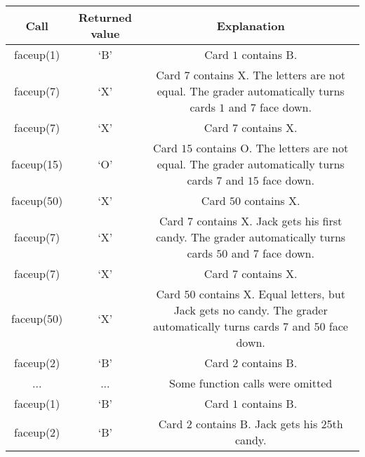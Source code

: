 \begin{center}
\renewcommand{\arraystretch}{1.5}
\begin{tabular}{|c|c|c|}
\hline
Call & Returned value & Explanation \\ 
\hline
faceup(1) & `B' & Card $1$ contains B. \\ 
\hline 
faceup(7) & `X' & \parbox{13cm}{\centering \vspace{2mm}Card $7$ contains X. The letters are not equal. The grader automatically turns cards $1$ and $7$ face down.\\\vspace{2mm}} \\ \hline
faceup(7) & `X' & Card $7$ contains X.\\ 
\hline
faceup(15) & `O' &\parbox{13cm}{\centering \vspace{2mm} Card $15$ contains O. The letters are not equal. The grader automatically turns cards $7$ and $15$ face down.\\\vspace{2mm}} \\ 
\hline
faceup(50) & `X' & Card $50$ contains X.\\ 
\hline
faceup(7) & `X' & \parbox{13cm}{\centering \vspace{2mm}Card $7$ contains X. Jack gets his first candy. The grader automatically turns cards $50$ and $7$ face down.\\\vspace{2mm}}\\ \hline
faceup(7) & `X' & Card $7$ contains X. \\ 
\hline
faceup(50) & `X' & \parbox{13cm}{\centering \vspace{2mm}Card $50$ contains X. Equal letters, but Jack gets no candy. The grader automatically turns cards $7$ and $50$ face down. \\\vspace{2mm}}\\ 
\hline
faceup(2) & `B' & Card $2$ contains B. \\ 
\hline
... & ... & Some function calls were omitted \\ \hline
faceup(1) & `B' & Card $1$ contains B. \\ \hline 
faceup(2) & `B' & Card $2$ contains B. Jack gets his 25th candy. \\ \hline 
\end{tabular}
\end{center}